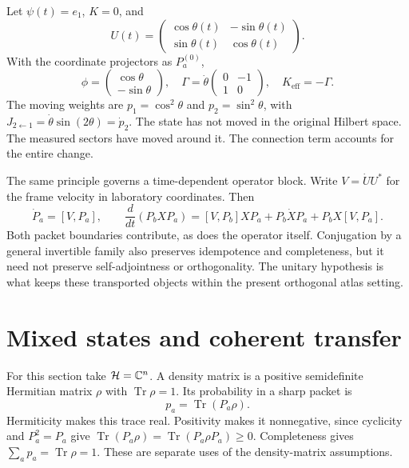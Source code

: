 \begin{example}\label{f:rotating-frame}
Let $\psi(t)=e_1$, $K=0$, and
\[
 U(t)=\begin{pmatrix}\cos\theta(t)&-\sin\theta(t)\\
 \sin\theta(t)&\cos\theta(t)\end{pmatrix}.
\]
With the coordinate projectors as $P_a^{(0)}$,
\[
 \phi=\begin{pmatrix}\cos\theta\\-\sin\theta\end{pmatrix},\quad
 \Gamma=\dot\theta\begin{pmatrix}0&-1\\1&0\end{pmatrix},\quad
 K_{\mathrm{eff}}=-\Gamma.
\]
The moving weights are $p_1=\cos^2\theta$ and $p_2=\sin^2\theta$, with
$J_{2\leftarrow1}=\dot\theta\sin(2\theta)=\dot p_2$.
The state has not moved in the original Hilbert space. The measured sectors have moved around it. The connection term accounts for the entire change.
\end{example}

The same principle governs a time-dependent operator block. Write $V=\dot UU^*$ for the frame velocity in laboratory coordinates. Then
\[
 \dot P_a=[V,P_a],\qquad
 \frac{d}{dt}(P_bXP_a)
 =[V,P_b]XP_a+P_b\dot XP_a+P_bX[V,P_a].
\]
Both packet boundaries contribute, as does the operator itself. Conjugation by a general invertible family also preserves idempotence and completeness, but it need not preserve self-adjointness or orthogonality. The unitary hypothesis is what keeps these transported objects within the present orthogonal atlas setting.




\section{Mixed states and coherent transfer}\label{f:mixed}

For this section take $\mathcal H=\mathbb C^n$. A density matrix is a positive semidefinite Hermitian matrix $\rho$ with $\operatorname{Tr}\rho=1$. Its probability in a sharp packet is
\begin{equation}\label{f:mixed-probability}
 p_a=\operatorname{Tr}(P_a\rho).
\end{equation}
Hermiticity makes this trace real. Positivity makes it nonnegative, since cyclicity and $P_a^2=P_a$ give
$\operatorname{Tr}(P_a\rho)=\operatorname{Tr}(P_a\rho P_a)\ge0$.
Completeness gives $\sum_ap_a=\operatorname{Tr}\rho=1$.
These are separate uses of the density-matrix assumptions.

